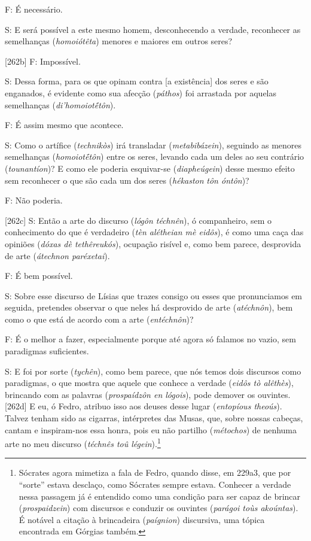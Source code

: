 F: É necessário.

S: E será possível a este mesmo homem, desconhecendo a verdade,
reconhecer as semelhanças (\emph{homoiótêta}) menores e maiores em
outros seres?

{[}262b{]} F: Impossível.

S: Dessa forma, para os que opinam contra {[}a existência{]} dos seres e
são enganados, é evidente como sua afecção (\emph{páthos}) foi arrastada
por aquelas semelhanças (\emph{di'homoiotḗtôn}).

F: É assim mesmo que acontece.

S: Como o artífice (\emph{technikòs}) irá transladar
(\emph{metabibázein}), seguindo as menores semelhanças
(\emph{homoiotḗtôn}) entre os seres, levando cada um deles ao seu
contrário (\emph{tounantíon})? E como ele poderia esquivar-se
(\emph{diapheúgein}) desse mesmo efeito sem reconhecer o que são cada um
dos seres (\emph{hékaston} \emph{tôn óntôn})?

F: Não poderia.

{[}262c{]} S: Então a arte do discurso (\emph{lógôn téchnên}), ó
companheiro, sem o conhecimento do que é verdadeiro (\emph{tèn alétheian
mè eidôs}), é como uma caça das opiniões (\emph{dóxas dè tethêreukós}),
ocupação risível e, como bem parece, desprovida de arte (\emph{átechnon
paréxetai}).

F: É bem possível.

S: Sobre esse discurso de Lísias que trazes consigo ou esses que
pronunciamos em seguida, pretendes observar o que neles há desprovido de
arte (\emph{atéchnôn}), bem como o que está de acordo com a arte
(\emph{entéchnôn})?

F: É o melhor a fazer, especialmente porque até agora só falamos no
vazio, sem paradigmas suficientes.

S: E foi por sorte (\emph{tychên}), como bem parece, que nós temos dois
discursos como paradigmas, o que mostra que aquele que conhece a verdade
(\emph{eidôs tò alêthès}), brincando com as palavras (\emph{prospaídzôn
en lógois}), pode demover os ouvintes. {[}262d{]} E eu, ó Fedro, atribuo
isso aos deuses desse lugar (\emph{entopíous theoús}). Talvez tenham
sido as cigarras, intérpretes das Musas, que, sobre nossas cabeças,
cantam e inspiram-nos essa honra, pois eu não partilho (\emph{métochos})
de nenhuma arte no meu discurso (\emph{téchnês toû légein}).\footnote{Sócrates
  agora mimetiza a fala de Fedro, quando disse, em 229a3, que por
  ``sorte'' estava desclaço, como Sócrates sempre estava. Conhecer a
  verdade nessa passagem já é entendido como uma condição para ser capaz
  de brincar (\emph{prospaidzein}) com discursos e conduzir os ouvintes
  (\emph{parágoi toùs akoúntas}). É notável a citação à brincadeira
  (\emph{paígnion}) discursiva, uma tópica encontrada em Górgias também.}


